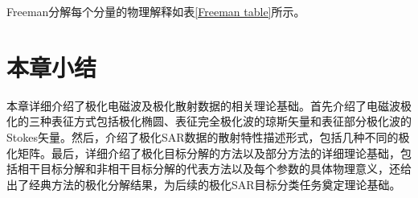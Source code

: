 Freeman分解每个分量的物理解释如表\ref{Freeman table}所示。
\begin{table}[!ht]
    \caption{Freeman分解}
    \label{Freeman table}
\end{table}

\section{本章小结}
本章详细介绍了极化电磁波及极化散射数据的相关理论基础。首先介绍了电磁波极化的三种表征方式包括极化椭圆、表征完全极化波的琼斯矢量和表征部分极化波的Stokes矢量。然后，介绍了极化SAR数据的散射特性描述形式，包括几种不同的极化矩阵。最后，详细介绍了极化目标分解的方法以及部分方法的详细理论基础，包括相干目标分解和非相干目标分解的代表方法以及每个参数的具体物理意义，还给出了经典方法的极化分解结果，为后续的极化SAR目标分类任务奠定理论基础。